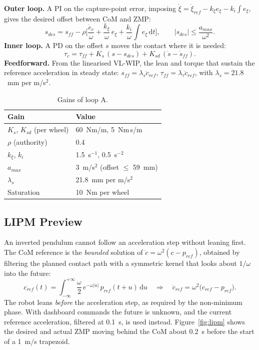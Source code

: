 \documentclass[11pt,a4paper]{article}
\begin{document}
\textbf{Outer loop.}  A PI on the capture-point error, imposing
$\dot\xi = \dot\xi_{ref} - k_\xi e_\xi - k_i\!\int e_\xi$, gives the desired offset between CoM
and ZMP:
\begin{equation}
    s_{des} = s_{ff} - \rho\Big[\frac{\dot e_c}{\omega} + \frac{k_\xi}{\omega}\,e_\xi
              + \frac{k_i}{\omega}\int e_\xi\,\mathrm{d}t\Big],
    \qquad |s_{des}|\le \frac{a_{max}}{\omega^2}.
\end{equation}
\textbf{Inner loop.}  A PD on the offset $s$ moves the contact where it is needed:
\begin{equation}
    \tau_c = \tau_{ff} + K_s\,(s - s_{des}) + K_{sd}\,(\dot s-\dot s_{ff}).
\end{equation}
\textbf{Feedforward.}  From the linearised VL-WIP, the lean and torque that sustain the
reference acceleration in steady state: $s_{ff} = \lambda_s\ddot c_{ref}$,
$\tau_{ff} = \lambda_\tau\ddot c_{ref}$, with $\lambda_s = 21.8$~mm per m/s$^2$.

\begin{table}[H]
    \centering
    \caption{Gains of loop A.}
    \label{tab:pid_gains}
    \begin{tabular}{ll}
        \toprule
        Gain & Value \\
        \midrule
        $K_s$, $K_{sd}$ (per wheel) & 60~Nm/m, 5~Nm\,s/m \\
        $\rho$ (authority) & 0.4 \\
        $k_\xi$, $k_i$ & 1.5~s$^{-1}$, 0.5~s$^{-2}$ \\
        $a_{max}$ & 3~m/s$^2$ (offset $\le$ 59~mm) \\
        $\lambda_s$ & 21.8~mm per m/s$^2$ \\
        Saturation & 10~Nm per wheel \\
        \bottomrule
    \end{tabular}
\end{table}

\subsection{LIPM Preview}

An inverted pendulum cannot follow an acceleration step without leaning first.  The CoM
reference is the \emph{bounded} solution of $\ddot c = \omega^2(c - p_{ref})$, obtained by
filtering the planned contact path with a symmetric kernel that looks about $1/\omega$ into the
future:
\begin{equation}
    c_{ref}(t) = \int_{-\infty}^{+\infty}\frac{\omega}{2}\,e^{-\omega|u|}\,p_{ref}(t+u)\,\mathrm{d}u
    \quad\Rightarrow\quad \ddot c_{ref} = \omega^2\big(c_{ref}-p_{ref}\big).
\end{equation}
The robot leans \emph{before} the acceleration step, as required by the non-minimum phase.  With
dashboard commands the future is unknown, and the current reference acceleration, filtered at
0.1~s, is used instead.  Figure~\ref{fig:lipm} shows the desired and actual ZMP moving behind the
CoM about 0.2~s before the start of a 1~m/s trapezoid.
\end{document}
